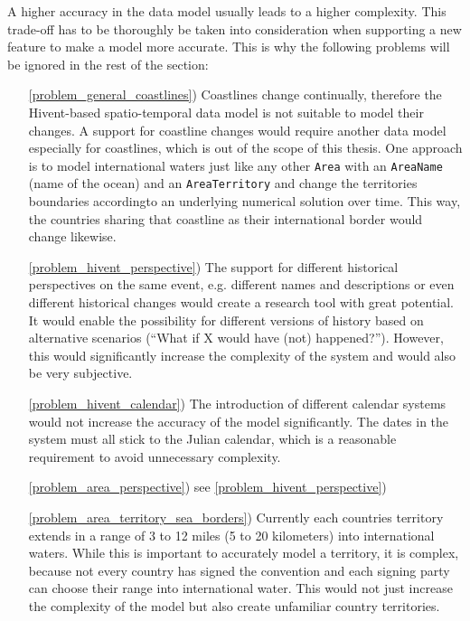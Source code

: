 A higher accuracy in the data model usually leads to a higher complexity. This trade-off has to be thoroughly be taken into consideration when supporting a new feature to make a model more accurate. This is why the following problems will be ignored in the rest of the section:
\begin{itemize}
  \item [\ref{problem_general_coastlines})] Coastlines change continually, therefore the Hivent-based spatio-temporal data model is not suitable to model their changes. A support for coastline changes would require another data model especially for coastlines, which is out of the scope of this thesis. One approach is to model international waters just like any other \texttt{Area} with an \texttt{AreaName} (name of the ocean) and an \texttt{AreaTerritory} and change the territories boundaries accordingto an underlying numerical solution over time. This way, the countries sharing that coastline as their international border would change likewise.
  \item[\ref{problem_hivent_perspective})] The support for different historical perspectives on the same event, e.g. different names and descriptions or even different historical changes would create a research tool with great potential. It would enable the possibility for different versions of history based on alternative scenarios (``What if X would have (not) happened?''). However, this would significantly increase the complexity of the system and would also be very subjective.
  \item[\ref{problem_hivent_calendar})] The introduction of different calendar systems would not increase the accuracy of the model significantly. The dates in the system must all stick to the Julian calendar, which is a reasonable requirement to avoid unnecessary complexity.
  \item[\ref{problem_area_perspective})] see \ref{problem_hivent_perspective})
  \item[\ref{problem_area_territory_sea_borders})] Currently each countries territory extends in a range of 3 to 12 miles (5 to 20 kilometers) \cite{UNSeaBorders} into international waters. While this is important to accurately model a territory, it is complex, because not every country has signed the convention and each signing party can choose their range into international water. This would not just increase the complexity of the model but also create unfamiliar country territories.
\end{itemize}


